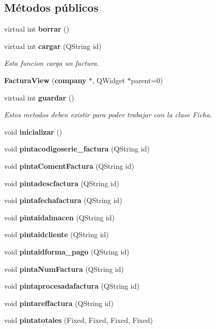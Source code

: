\subsection*{M\'{e}todos p\'{u}blicos}
\begin{CompactItemize}
\item 
virtual int {\bf borrar} ()\label{classFacturaView_a0}

\item 
virtual int {\bf cargar} (QString id)\label{classFacturaView_a1}

\begin{CompactList}\small\item\em Esta funcion carga un factura. \item\end{CompactList}\item 
{\bf Factura\-View} ({\bf company} $\ast$, QWidget $\ast$parent=0)
\item 
virtual int {\bf guardar} ()\label{classFacturaView_a3}

\begin{CompactList}\small\item\em Estos metodos deben existir para poder trabajar con la clase Ficha. \item\end{CompactList}\item 
void {\bf inicializar} ()\label{classFacturaView_a4}

\item 
void {\bf pintacodigoserie\_\-factura} (QString id)\label{classFacturaView_a5}

\item 
void {\bf pinta\-Coment\-Factura} (QString id)\label{classFacturaView_a6}

\item 
void {\bf pintadescfactura} (QString id)\label{classFacturaView_a7}

\item 
void {\bf pintafechafactura} (QString id)\label{classFacturaView_a8}

\item 
void {\bf pintaidalmacen} (QString id)\label{classFacturaView_a9}

\item 
void {\bf pintaidcliente} (QString id)\label{classFacturaView_a10}

\item 
void {\bf pintaidforma\_\-pago} (QString id)\label{classFacturaView_a11}

\item 
void {\bf pinta\-Num\-Factura} (QString id)\label{classFacturaView_a12}

\item 
void {\bf pintaprocesadafactura} (QString id)\label{classFacturaView_a13}

\item 
void {\bf pintareffactura} (QString id)\label{classFacturaView_a14}

\item 
void {\bf pintatotales} (Fixed, Fixed, Fixed, Fixed)\label{classFacturaView_a15}

\end{CompactItemize}


